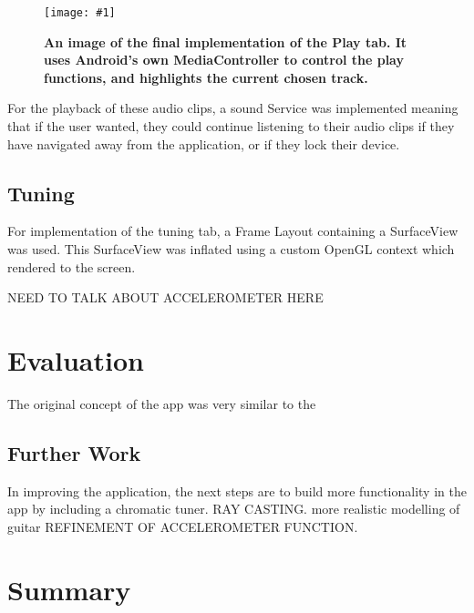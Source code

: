 \documentclass[conference]{acmsiggraph}
\newcommand{\figuremacroF}[3]{
	\begin{figure}[H] %
		\centering
		\texttt{[image: \#1]}
		\caption[#2]{\textbf{#2}}
		\label{fig:#1}
	\end{figure}
}
\begin{document}
\figuremacroF
{playback}
{An image of the final implementation of the Play tab. It uses Android's own MediaController to control the play functions, and highlights the current chosen track.}
{1.0}

For the playback of these audio clips, a sound Service was implemented meaning that if the user wanted, they could continue listening to their audio clips if they have navigated away from the application, or if they lock their device.

\subsection{Tuning}

For implementation of the tuning tab, a Frame Layout containing a SurfaceView was used. This SurfaceView was inflated using a custom OpenGL context which rendered to the screen. \cite{OpenGL}

NEED TO TALK ABOUT ACCELEROMETER HERE


\section{Evaluation}



The original concept of the app was very similar to the 


\subsection{Further Work}

In improving the application, the next steps are to build more functionality in the app by including a chromatic tuner. RAY CASTING. more realistic modelling of guitar REFINEMENT OF ACCELEROMETER FUNCTION.


\section{Summary}






\end{document}
